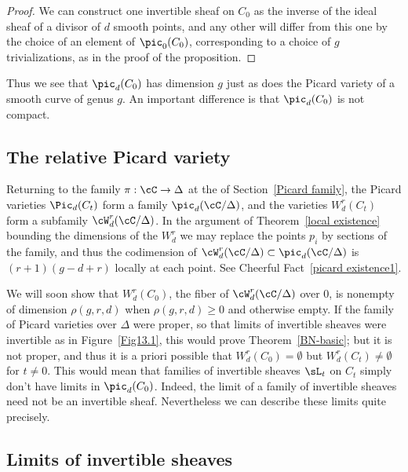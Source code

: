 \begin{proof}
We can construct one invertible sheaf on $C_{0}$ as the inverse of the
ideal sheaf of a divisor of $d$ smooth points, and any other will differ
from this one by the choice of an element of $\pic_{0}(C_{0})$,
corresponding to a choice of $g$ trivializations, as in the proof of
the proposition. 
\unif
\end{proof}

Thus we see that $\pic_{d}(C_{0})$ has dimension $g$ just as does the
Picard variety
%
of a smooth curve
of genus $g$. An important difference is that $\pic_{d}(C_{0})$ is
not compact.

\subsection*{The relative Picard variety}

Returning to the family $\pi : \cC \to \Delta$ at the
% 
of
Section~\ref{Picard family}, the Picard varieties $\Pic_d(C_t)$ form
a family $\pic_d(\cC/\Delta)$, and the varieties $W^r_d(C_t)$ form a
subfamily $\cW^r_d(\cC/\Delta)$.  In the argument
of Theorem~\ref{local existence} bounding  the dimensions of the $W^r_d$
we may replace the points $p_i$ by sections of the family, and thus
the codimension of $\cW^r_d(\cC/\Delta) \subset \pic_d(\cC/\Delta)$
is 
$(r+1)(g-d+r)$ locally at each point. See
Cheerful Fact~\ref{picard existence1}.

We will soon show that $W^{r}_{d}(C_{0})$, the fiber of
$\cW^{r}_{d}(\cC/\Delta)$ over 0,  is nonempty of dimension $\rho(g,r,d)$
when $\rho(g,r,d)\geq 0$ and otherwise empty. If the family of Picard
varieties over $\Delta$ were proper, so that limits of invertible sheaves
were invertible as in Figure~\ref{Fig13.1},
this would prove Theorem~\ref{BN-basic}; but it is not proper, and
thus it is a priori possible that $W^{r}_{d}(C_{0})=\emptyset$ but
$W^{r}_{d}(C_{t})\neq \emptyset$ for $t\neq 0$. This would mean that
families of invertible sheaves $\sL_{t}$ on $C_{t}$  simply don't
have  limits
in $\pic_{d}(C_{0})$. Indeed, the limit of a family of invertible sheaves
need not be an invertible
sheaf. Nevertheless we can describe these limits quite precisely.

\subsection*{Limits of invertible sheaves}

